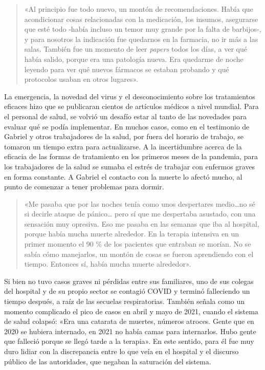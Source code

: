 \begin{quote}
«Al principio fue todo nuevo, un montón de recomendaciones. Había que acondicionar cosas relacionadas con la medicación, los insumos, asegurarse que esté todo -había incluso un temor muy grande por la falta de barbijos-, y para nosotros la indicación fue quedarnos en la farmacia, no ir más a las salas. También fue un momento de leer \emph{papers} todos los días, a ver qué había salido, porque era una patología nueva. Era quedarme de noche leyendo para ver qué nuevos fármacos se estaban probando y qué protocolos usaban en otros lugares».
\end{quote}

La emergencia, la novedad del virus y el desconocimiento sobre los tratamientos eficaces hizo que se publicaran cientos de artículos médicos a nivel mundial. Para el personal de salud, se volvió un desafío estar al tanto de las novedades para evaluar qué se podía implementar. En muchos casos, como en el testimonio de Gabriel y otros trabajadores de la salud, por fuera del horario de trabajo, se tomaron un tiempo extra para actualizarse. A la incertidumbre acerca de la eficacia de las formas de tratamiento en los primeros meses de la pandemia, para los trabajadores de la salud se sumaba el estrés de trabajar con enfermos graves en forma constante. A Gabriel el contacto con la muerte lo afectó mucho, al punto de comenzar a tener problemas para dormir.

\begin{quote}
«Me pasaba que por las noches tenía como unos despertares medio\ldots no sé si decirle ataque de pánico\ldots{} pero sí que me despertaba asustado, con una sensación muy opresiva. Eso me pasaba en las semanas que iba al hospital, porque había mucha muerte alrededor. En la terapia intensiva en un primer momento el 90 \% de los pacientes que entraban se morían. No se sabía cómo manejarlos, un montón de cosas se fueron aprendiendo con el tiempo. Entonces sí, había mucha muerte alrededor».
\end{quote}

Si bien no tuvo casos graves ni pérdidas entre sus familiares, uno de sus colegas del hospital y de su propio sector se contagió COVID y terminó falleciendo un tiempo después, a raíz de las secuelas respiratorias. También señala como un momento complicado el pico de casos en abril y mayo de 2021, cuando el sistema de salud colapsó: «Era una catarata de muertes, números atroces. Gente que en 2020 se hubiera internado, en 2021 no había camas para internarlos. Hubo gente que falleció porque se llegó tarde a la terapia». En este sentido, para él fue muy duro lidiar con la discrepancia entre lo que veía en el hospital y el discurso público de las autoridades, que negaban la saturación del sistema.

